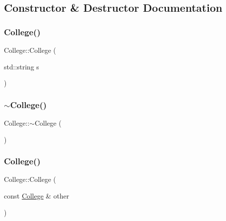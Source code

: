 \begin{DoxyCodeInclude}

\end{DoxyCodeInclude}
 
\begin{DoxyCodeInclude}
\end{DoxyCodeInclude}
 

\subsection{Constructor \& Destructor Documentation}
\hypertarget{class_college_adabaf4087355e83f9f7d39f1e1498b41}{}\label{class_college_adabaf4087355e83f9f7d39f1e1498b41} 
\subsubsection{\texorpdfstring{College()}{College()}\hspace{0.1cm}{\footnotesize\ttfamily [1/2]}}
{\footnotesize\ttfamily College\+::\+College (\begin{DoxyParamCaption}\item[{std\+::string}]{s }\end{DoxyParamCaption})}

\hypertarget{class_college_a42fcce4f87439592eaefd96564a796a8}{}\label{class_college_a42fcce4f87439592eaefd96564a796a8} 
\subsubsection{\texorpdfstring{$\sim$\+College()}{~College()}}
{\footnotesize\ttfamily College\+::$\sim$\+College (\begin{DoxyParamCaption}{ }\end{DoxyParamCaption})}

\hypertarget{class_college_ad007ad488e5a7ef986114080d0c8e101}{}\label{class_college_ad007ad488e5a7ef986114080d0c8e101} 
\subsubsection{\texorpdfstring{College()}{College()}\hspace{0.1cm}{\footnotesize\ttfamily [2/2]}}
{\footnotesize\ttfamily College\+::\+College (\begin{DoxyParamCaption}\item[{const \hyperlink{class_college}{College} \&}]{other }\end{DoxyParamCaption})}




